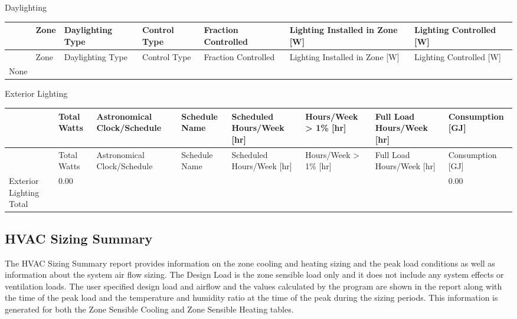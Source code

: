Daylighting

\begin{longtable}[c]{p{0.85in}p{0.85in}p{0.85in}p{0.85in}p{0.85in}p{0.85in}p{0.85in}}
\toprule 
 & Zone & Daylighting Type & Control Type & Fraction Controlled & Lighting Installed in Zone [W] & Lighting Controlled [W] \tabularnewline
\midrule
\endfirsthead

\toprule 
 & Zone & Daylighting Type & Control Type & Fraction Controlled & Lighting Installed in Zone [W] & Lighting Controlled [W] \tabularnewline
\midrule
\endhead

None & ~ & ~ & ~ & ~ & ~ & ~ \tabularnewline
\bottomrule
\end{longtable}

Exterior Lighting

\begin{longtable}[c]{>{\raggedright}p{0.75in}>{\raggedright}p{0.75in}>{\raggedright}p{0.75in}>{\raggedright}p{0.75in}>{\raggedright}p{0.75in}>{\raggedright}p{0.75in}>{\raggedright}p{0.75in}>{\raggedright}p{0.75in}}
\toprule 
 & Total Watts & Astronomical Clock/Schedule & Schedule Name & Scheduled Hours/Week [hr] & Hours/Week  >  1\% [hr] & Full Load Hours/Week [hr] & Consumption [GJ] \tabularnewline
\midrule
\endfirsthead

\toprule 
 & Total Watts & Astronomical Clock/Schedule & Schedule Name & Scheduled Hours/Week [hr] & Hours/Week  >  1\% [hr] & Full Load Hours/Week [hr] & Consumption [GJ] \tabularnewline
\midrule
\endhead

Exterior Lighting Total & 0.00 & ~ & ~ & ~ & ~ & ~ & 0.00 \tabularnewline
\bottomrule
\end{longtable}

\subsection{HVAC Sizing Summary}\label{hvac-sizing-summary}

The HVAC Sizing Summary report provides information on the zone cooling and heating sizing and the peak load conditions as well as information about the system air flow sizing. The Design Load is the zone sensible load only and it does not include any system effects or ventilation loads. The user specified design load and airflow and the values calculated by the program are shown in the report along with the time of the peak load and the temperature and humidity ratio at the time of the peak during the sizing periods. This information is generated for both the Zone Sensible Cooling and Zone Sensible Heating tables.

